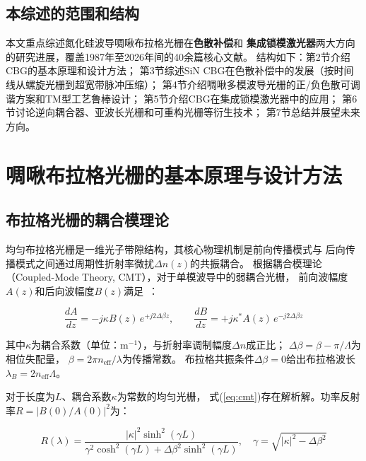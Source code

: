 \documentclass[12pt,a4paper,twoside]{article}
\begin{document}
\subsection{本综述的范围和结构}

本文重点综述氮化硅波导啁啾布拉格光栅在\textbf{色散补偿}和
\textbf{集成锁模激光器}两大方向的研究进展，覆盖1987年至2026年间的40余篇核心文献。
结构如下：第2节介绍CBG的基本原理和设计方法；
第3节综述SiN CBG在色散补偿中的发展（按时间线从螺旋光栅到超宽带脉冲压缩）；
第4节介绍啁啾多模波导光栅的正/负色散可调谐方案和TM型工艺鲁棒设计；
第5节介绍CBG在集成锁模激光器中的应用；
第6节讨论逆向耦合器、亚波长光栅和可重构光栅等衍生技术；
第7节总结并展望未来方向。

\newpage

\section{啁啾布拉格光栅的基本原理与设计方法}

\subsection{布拉格光栅的耦合模理论}

均匀布拉格光栅是一维光子带隙结构，其核心物理机制是前向传播模式与
后向传播模式之间通过周期性折射率微扰$\Delta n(z)$的共振耦合。
根据耦合模理论（Coupled-Mode Theory, CMT），对于单模波导中的弱耦合光栅，
前向波幅度$A(z)$和后向波幅度$B(z)$满足~\cite{ouellette1987}：

\begin{equation}
\frac{dA}{dz} = -j\kappa B(z)\, e^{+j2\Delta\beta z}, \qquad
\frac{dB}{dz} = +j\kappa^* A(z)\, e^{-j2\Delta\beta z}
\label{eq:cmt}
\end{equation}

其中$\kappa$为耦合系数（单位：m$^{-1}$），与折射率调制幅度$\Delta n$成正比；
$\Delta\beta = \beta - \pi/\Lambda$为相位失配量，
$\beta = 2\pi n_{\text{eff}}/\lambda$为传播常数。
布拉格共振条件$\Delta\beta = 0$给出布拉格波长
$\lambda_B = 2n_{\text{eff}}\Lambda$。

对于长度为$L$、耦合系数$\kappa$为常数的均匀光栅，
式(\ref{eq:cmt})存在解析解。功率反射率$R = |B(0)/A(0)|^2$为：

\begin{equation}
R(\lambda) = \frac{|\kappa|^2 \sinh^2(\gamma L)}
                  {\gamma^2 \cosh^2(\gamma L) + \Delta\beta^2 \sinh^2(\gamma L)},
\quad \gamma = \sqrt{|\kappa|^2 - \Delta\beta^2}
\label{eq:reflectivity}
\end{equation}
\end{document}
